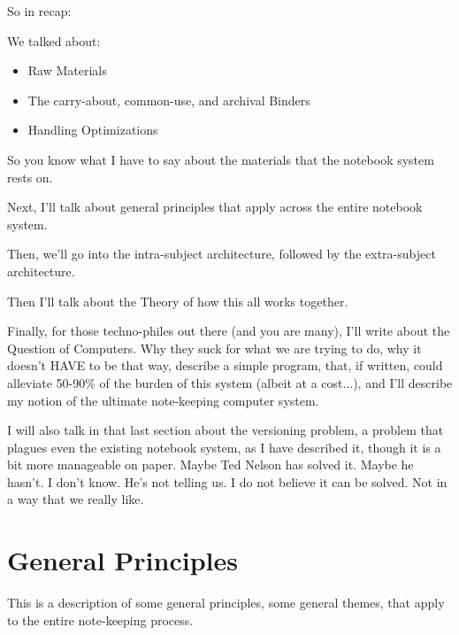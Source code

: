 \documentclass[oneside]{book}
\begin{document}
So in recap:

We talked about:
\begin{itemize}
\item Raw Materials
\item The carry-about, common-use, and archival Binders
\item Handling Optimizations
\end{itemize}

So you know what I have to say about the materials that the notebook
system rests on.

Next, I'll talk about general principles that apply across the entire
notebook system.

Then, we'll go into the intra-subject architecture, followed by the
extra-subject architecture.

Then I'll talk about the Theory of how this all works together.

Finally, for those techno-philes out there (and you are many), I'll
write about the Question of Computers. Why they suck for what we are
trying to do, why it doesn't HAVE to be that way, describe a simple
program, that, if written, could alleviate 50-90\% of the burden of
this system (albeit at a cost...), and I'll describe my notion of the
ultimate note-keeping computer system.

I will also talk in that last section about the versioning problem, a
problem that plagues even the existing notebook system, as I have
described it, though it is a bit more manageable on paper. Maybe Ted
Nelson has solved it. Maybe he hasn't. I don't know. He's not telling
us. I do not believe it can be solved. Not in a way that we really like.


\chapter{General Principles}
This is a description of some general principles, some general themes,
that apply to the entire note-keeping process.
\end{document}
